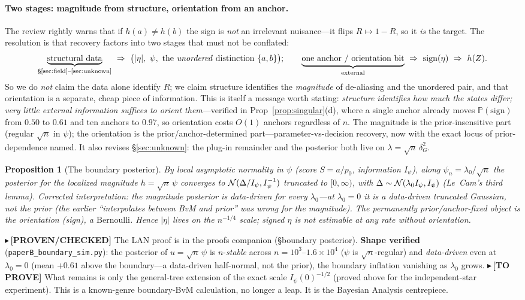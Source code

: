 \documentclass[11pt]{article}
\newtheorem{proposition}{Proposition}
\newcommand{\PROVEN}[1]{{\color{teal}\small$\blacktriangleright$\,\textbf{[PROVEN/CHECKED]} #1}}
\newcommand{\CONJ}[1]{{\color{violet}\small$\blacktriangleright$\,\textbf{[TO PROVE]} #1}}
\renewcommand{\Pr}{\mathbb{P}}\newcommand{\I}{\mathbb{I}}\newcommand{\HH}{\mathbb{H}}
\begin{document}
\paragraph{Two stages: magnitude from structure, orientation from an anchor.} The review rightly warns that if
$h(a)\neq h(b)$ the sign is \emph{not} an irrelevant nuisance---it flips $R\mapsto1-R$, so it \emph{is} the
target. The resolution is that recovery factors into two stages that must not be conflated:
\[
   \underbrace{\text{structural data}}_{\text{§\ref{sec:field}--\ref{sec:unknown}}}\ \Rightarrow\
   \big(|\eta|,\ \psi,\ \text{the \emph{unordered} distinction }\{a,b\}\big);\qquad
   \underbrace{\text{one anchor / orientation bit}}_{\text{external}}\ \Rightarrow\ \mathrm{sign}(\eta)\ \Rightarrow\ h(Z).
\]
So we do \emph{not} claim the data alone identify $R$; we claim structure identifies the \emph{magnitude} of
de-aliasing and the unordered pair, and that orientation is a separate, cheap piece of information. This is itself
a message worth stating: \emph{structure identifies how much the states differ; very little external information
suffices to orient them}---verified in Prop~\ref{prop:singular}(d), where a single anchor already moves
$\Pr(\text{sign})$ from $0.50$ to $0.61$ and ten anchors to $0.97$, so orientation costs $O(1)$ anchors regardless
of $n$. The magnitude is the prior-insensitive part (regular $\sqrt n$ in $\psi$); the orientation is the
prior/anchor-determined part---parameter-vs-decision recovery, now with the exact locus of prior-dependence named.
It also revises \S\ref{sec:unknown}: the plug-in remainder and the posterior both live on $\lambda=\sqrt n\,\delta_G^2$.
\begin{proposition}[The boundary posterior]\label{conj:bayes}
By local asymptotic normality in $\psi$ (score $S=a/p_0$, information $I_\psi$), along $\psi_n=\lambda_0/\sqrt n$
the posterior for the localized magnitude $h=\sqrt n\,\psi$ converges to $\mathcal{N}(\Delta/I_\psi,I_\psi^{-1})$ truncated
to $[0,\infty)$, with $\Delta\sim\mathcal{N}(\lambda_0 I_\psi,I_\psi)$ (Le~Cam's third lemma). \emph{Corrected
interpretation:} the \emph{magnitude} posterior is data-driven for \emph{every} $\lambda_0$---at $\lambda_0{=}0$ it
is a data-driven truncated Gaussian, \emph{not} the prior (the earlier ``interpolates between BvM and prior'' was
wrong for the magnitude). The permanently prior/anchor-fixed object is the \emph{orientation} (sign), a
$\mathrm{Bernoulli}$. Hence $|\eta|$ lives on the $n^{-1/4}$ scale; signed $\eta$ is not estimable at any rate
without orientation.
\end{proposition}
\PROVEN{The LAN proof is in the proofs companion (\S boundary posterior). \textbf{Shape verified}
(\texttt{paperB\_boundary\_sim.py}): the posterior of $u=\sqrt n\,\psi$ is $n$-\emph{stable} across
$n{=}10^3$--$1.6{\times}10^4$ ($\psi$ is $\sqrt n$-regular) and \emph{data-driven} even at $\lambda_0{=}0$ (mean
$+0.61$ above the boundary---a data-driven half-normal, not the prior), the boundary inflation vanishing as
$\lambda_0$ grows.}
\CONJ{What remains is only the general-tree extension of the exact scale $I_\psi(0)^{-1/2}$ (proved above for the
independent-star experiment). This is a known-genre boundary-BvM
calculation, no longer a leap. It is the Bayesian Analysis centrepiece.}
\end{document}
